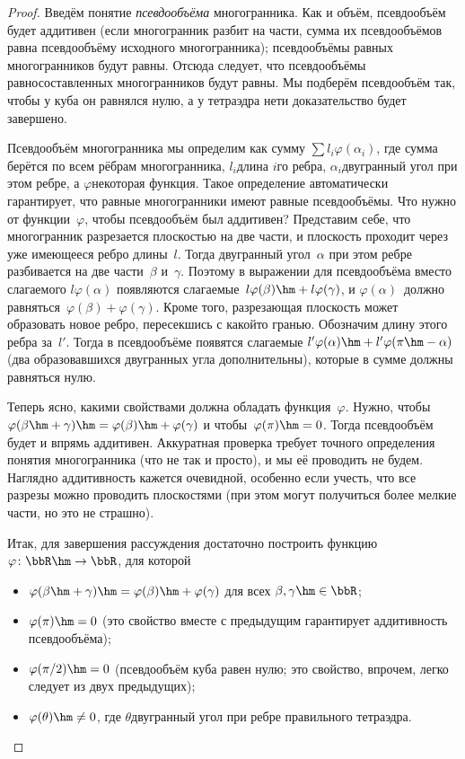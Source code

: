 \begin{proof}
Введём понятие \emph{псевдообъёма} многогранника. Как
и объём, псевдообъём будет аддитивен (если многогранник разбит
на части, сумма их псевдообъёмов равна псевдообъёму исходного
многогранника); псевдообъёмы равных многогранников будут равны.
Отсюда следует, что псевдообъёмы равносоставленных
многогранников будут равны. Мы подберём псевдообъём так,
чтобы у куба он равнялся нулю, а у тетраэдра нет\т и
доказательство будет завершено.

Псевдообъём многогранника мы определим как сумму $\sum l_i
\varphi(\alpha_i)$, где сумма берётся по всем рёбрам многогранника,
$l_i$\т длина $i$\д го ребра, $\alpha_i$\т двугранный угол при
этом ребре, а $\varphi$\т некоторая функция. Такое определение
автоматически гарантирует, что равные многогранники имеют равные
псевдообъёмы. Что нужно от функции~$\varphi$, чтобы псевдообъём был
аддитивен? Представим себе, что многогранник разрезается
плоскостью на две части, и плоскость проходит через уже
имеющееся ребро длины~$l$. Тогда двугранный угол~$\alpha$ при этом ребре
разбивается на две части~$\beta$
и~$\gamma$. Поэтому в выражении для псевдообъёма вместо
слагаемого $l\varphi(\alpha)$ появляются
слагаемые~$l\varphi(\beta)\hm+l\varphi(\gamma)$, и $\varphi(\alpha)$~должно
равняться~$\varphi(\beta)+\varphi(\gamma)$.
Кроме того, разрезающая плоскость может образовать новое ребро,
пересекшись с какой\д то гранью. Обозначим длину этого ребра
за~$l'$. Тогда в псевдообъёме появятся слагаемые
$l'\varphi(\alpha)\hm+l'\varphi(\pi\hm-\alpha)$ (два
образовавшихся двугранных угла дополнительны), которые в сумме должны
равняться нулю.

Теперь ясно, какими свойствами должна обладать функция~$\varphi$.
Нужно, чтобы $\varphi(\beta\hm+\gamma)\hm=\varphi(\beta)\hm+\varphi(\gamma)$ и
чтобы~$\varphi(\pi)\hm=0$. Тогда псевдообъём будет и впрямь аддитивен.
Аккуратная проверка требует точного определения понятия
многогранника (что не так и просто), и мы её проводить не будем. Наглядно
аддитивность
кажется очевидной, особенно если учесть, что все разрезы можно
проводить плоскостями (при этом могут получиться более мелкие
части, но это не страшно).

Итак, для завершения рассуждения достаточно построить функцию
$\varphi\colon\bbR\hm\to\bbR$, для которой
\begin{itemize}
\item
$\varphi(\beta\hm+\gamma)\hm=\varphi(\beta)\hm+\varphi(\gamma)$ для всех
       $\beta,\gamma\hm\in\bbR$;
\item
$\varphi(\pi)\hm=0$ (это свойство вместе с предыдущим гарантирует
аддитивность псевдообъёма);
\item
$\varphi(\pi/2)\hm=0$ (псевдообъём куба равен нулю; это свойство,
впрочем, легко следует из двух предыдущих);
\item
$\varphi(\theta)\hm\ne 0$, где $\theta$\т двугранный угол при
ребре правильного тетраэдра.
\end{itemize}


\end{proof}
